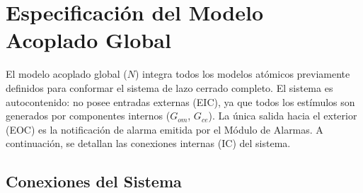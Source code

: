 \section{Especificación del Modelo Acoplado Global}
El modelo acoplado global ($N$) integra todos los modelos atómicos previamente definidos para conformar el sistema de lazo cerrado completo. El sistema es autocontenido: no posee entradas externas (EIC), ya que todos los estímulos son generados por componentes internos ($G_{om}$, $G_{ce}$). La única salida hacia el exterior (EOC) es la notificación de alarma emitida por el Módulo de Alarmas. A continuación, se detallan las conexiones internas (IC) del sistema.

\subsection{Conexiones del Sistema}
